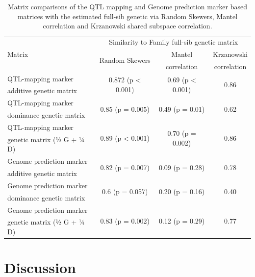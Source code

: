 \begin{refsection}
\begin{table}[htbp]
	\caption[Matrix comparisons of the QTL and Genome
	prediction matrices]{Matrix comparisons of the QTL mapping and Genome
	prediction marker based matrices with the estimated full-sib genetic
	via Random Skewers, Mantel correlation and Krzanowski shared subspace
	correlation.}
	\vspace{1em}
	\centering
	\begin{tabular}{l|ccc}
	\toprule
	& \multicolumn{3}{c}{Similarity to Family full-sib genetic matrix} \\
\cline{2-4}
Matrix & \multirow{2}{*}{Random Skewers} & Mantel  & Krzanowski  \\
& & correlation & correlation \\
\midrule
QTL-mapping marker  & \multirow{2}{*}{0.872 (p \textless{} 0.001)} & \multirow{2}{*}{0.69 (p \textless{} 0.001)} & \multirow{2}{*}{0.86} \\
additive genetic matrix & & & \\
\cline{1-1}
QTL-mapping marker & \multirow{2}{*}{0.85 (p = 0.005)} & \multirow{2}{*}{0.49 (p = 0.01)} & \multirow{2}{*}{0.62} \\
 dominance genetic matrix & & & \\
\cline{1-1}
QTL-mapping marker  & \multirow{2}{*}{0.89 (p \textless{} 0.001)} & \multirow{2}{*}{0.70 (p = 0.002)} & \multirow{2}{*}{0.86} \\
genetic matrix (½ G + ¼ D) & & & \\
\cline{1-1}
Genome prediction marker & \multirow{2}{*}{0.82 (p = 0.007)} & \multirow{2}{*}{0.09 (p = 0.28)} & \multirow{2}{*}{0.78} \\
 additive genetic matrix  & & & \\
\cline{1-1}
Genome prediction marker & \multirow{2}{*}{0.6 (p = 0.057)} & \multirow{2}{*}{0.20 (p = 0.16)} & \multirow{2}{*}{0.40} \\
 dominance genetic matrix & & & \\
\cline{1-1}
Genome prediction marker & \multirow{2}{*}{0.83 (p = 0.002)} & \multirow{2}{*}{0.12 (p = 0.29)} & \multirow{2}{*}{0.77} \\
genetic matrix (½ G + ¼ D)  & & & \\
\bottomrule
	\end{tabular}
	\label{joh:matcompare}
\end{table}

\section{Discussion}


\end{refsection}
